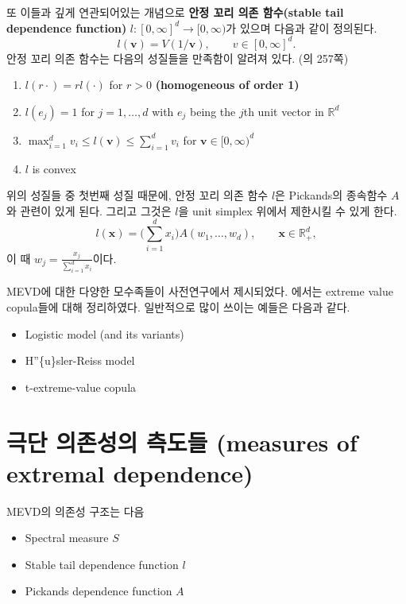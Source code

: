 \documentclass[b5paper,]{scrbook}
\theoremstyle{plain}
\theoremstyle{definition}
\numberwithin{equation}{section}
\begin{document}
또 이들과 깊게 연관되어있는 개념으로 \textbf{안정 꼬리 의존 함수(stable tail dependence function)} \(l:[0,\infty]^{d} \rightarrow [0,\infty)\)가 있으며 다음과 같이 정의된다.
\[l(\mathbf{v}) = V(1/\mathbf{v}), \qquad{v\in[0,\infty]^{d}.}\]
안정 꼬리 의존 함수는 다음의 성질들을 만족함이 알려져 있다. (\citep{Beirlant2004}의 257쪽)

\begin{enumerate}
\def\labelenumi{\arabic{enumi}.}
\item
  \(l(r\cdot) = r l(\cdot)\) for \(r>0\) \textbf{(homogeneous of order 1)}
\item
  \(l(e_{j} ) = 1\) for \(j=1,\ldots, d\) with \(e_{j}\) being the \(j\)th unit vector in \(\mathbb{R}^{d}\)
\item
  \(\max_{i=1}^{d}v_{i} \leq l(\mathbf{v})\leq \sum_{i=1}^{d}v_{i}\) for \(\mathbf{v} \in [0,\infty)^{d}\)
\item
  \(l\) is convex
\end{enumerate}

위의 성질들 중 첫번째 성질 때문에, 안정 꼬리 의존 함수 \(l\)은 Pickands의 종속함수 \(A\)와 관련이 있게 된다. 그리고 그것은 \(l\)을 unit simplex 위에서 제한시킬 수 있게 한다.
\[l(\mathbf{x}) = \Big( \sum_{i=1}^{d}x_{i} \Big) A(w_{1},\ldots, w_{d}), \qquad{\mathbf{x}\in\mathbb{R}_{+}^{d}},\]
이 때 \(w_{j} = \frac{x_{j}}{\sum_{i=1}^{d}x_{i}}\)이다.

MEVD에 대한 다양한 모수족들이 사전연구에서 제시되었다. \citep{Gudendorf2010}에서는 extreme value copula들에 대해 정리하였다. 일반적으로 많이 쓰이는 예들은 다음과 같다.

\begin{itemize}
\item
  Logistic model (and its variants)
\item
  H''\{u\}sler-Reiss model
\item
  t-extreme-value copula
\end{itemize}

\hypertarget{---measures-of-extremal-dependence}{%
\section{극단 의존성의 측도들 (measures of extremal dependence)}\label{---measures-of-extremal-dependence}}

MEVD의 의존성 구조는 다음

\begin{itemize}
\item
  Spectral measure \(S\)
\item
  Stable tail dependence function \(l\)
\item
  Pickands dependence function \(A\)
\end{itemize}
\end{document}
